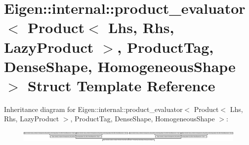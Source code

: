 \hypertarget{struct_eigen_1_1internal_1_1product__evaluator_3_01_product_3_01_lhs_00_01_rhs_00_01_lazy_producdc5bcb3d77429f754f91ead5635235a9}{}\section{Eigen\+:\+:internal\+:\+:product\+\_\+evaluator$<$ Product$<$ Lhs, Rhs, Lazy\+Product $>$, Product\+Tag, Dense\+Shape, Homogeneous\+Shape $>$ Struct Template Reference}
\label{struct_eigen_1_1internal_1_1product__evaluator_3_01_product_3_01_lhs_00_01_rhs_00_01_lazy_producdc5bcb3d77429f754f91ead5635235a9}
Inheritance diagram for Eigen\+:\+:internal\+:\+:product\+\_\+evaluator$<$ Product$<$ Lhs, Rhs, Lazy\+Product $>$, Product\+Tag, Dense\+Shape, Homogeneous\+Shape $>$\+:\begin{figure}[H]
\begin{center}
\leavevmode
\includegraphics[height=0.590717cm]{struct_eigen_1_1internal_1_1product__evaluator_3_01_product_3_01_lhs_00_01_rhs_00_01_lazy_producdc5bcb3d77429f754f91ead5635235a9}
\end{center}
\end{figure}
